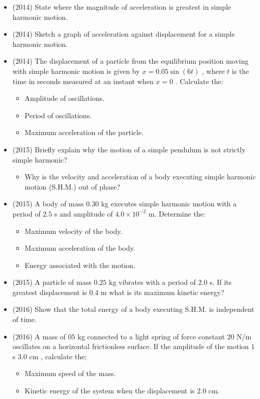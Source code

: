 \documentclass{article}
\begin{document}
\begin{itemize}
\item (2014)  State where the magnitude of acceleration is greatest in simple harmonic motion.
\item (2014)  Sketch a graph of acceleration against displacement for a simple harmonic motion.
\item (2014)  The displacement of a particle from the equilibrium position moving with simple harmonic motion is given by $ x=0.05 \sin(6t)$ , where $ t$ is the time in seconds measured at an instant when $ x=0$ .  Calculate the:
 \begin{itemize}
\item Amplitude of oscillations.
\item Period of oscillations. 
\item  Maximum acceleration of the particle. 
\end{itemize}
\item (2015)  Briefly explain why the motion of a simple pendulum is not strictly simple harmonic? 
 \begin{itemize}
\item Why is the velocity and acceleration of a body executing simple harmonic motion (S.H.M.) out of phase? 
\end{itemize}
\item (2015)  A body of mass $ 0.30$ kg executes simple harmonic motion with a period of $ 2.5$ s and amplitude of $ 4.0\times10^{-2}$ m. Determine the:
 \begin{itemize}
\item Maximum velocity of the body. 
\item Maximum acceleration of the body. 
\item Energy associated with the motion.
\end{itemize}
\item (2015)  A particle of mass $ 0.25$ kg vibrates with a period of $ 2.0$ s. If its greatest displacement is $ 0.4$ m what is its maximum kinetic energy?
\item (2016)  Show that the total energy of a body executing S.H.M. is independent of time.
\item (2016)  A mass of $ 05$ kg connected to a light spring of force constant $ 20$ N$/$m oscillates on a  horizontal frictionless surface. If the amplitude of the motion $ 1$ s $ 3.0$ cm , calculate the;
 \begin{itemize}
\item Maximum speed of the mass.
\item  Kinetic energy of the system when the displacement is $ 2.0$ cm.

\end{itemize}
\end{itemize}
\end{document}
